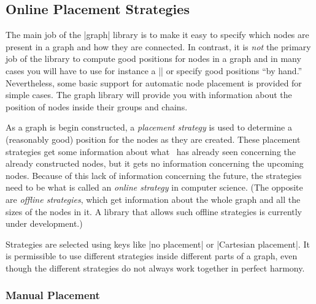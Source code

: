 \subsection{Online Placement Strategies}
\label{section-library-graphs-placement}

The main job of the |graph| library is to make it easy to specify
which nodes are present in a graph and how they are connected. In
contrast, it is \emph{not} the primary job of the library to compute
good positions for nodes in a graph and in many cases you will have to
use for instance a |\matrix| or specify good positions ``by hand.''
Nevertheless, some basic support for automatic node placement is
provided for simple cases. The graph library will provide you with
information about the position of nodes inside their groups and
chains. 


As a graph is begin constructed, a \emph{placement strategy} is used
to determine a (reasonably good) position for the nodes as they are
created. These placement strategies get some information about what
\tikzname\ has already seen concerning the already constructed nodes,
but it gets no information concerning the upcoming nodes. Because of
this lack of information concerning the future, the strategies need to
be what is called an \emph{online strategy} in computer science. (The
opposite are \emph{offline strategies}, which get information about
the whole graph and all the sizes of the nodes in it. A library that
allows such offline strategies is currently under development.)

Strategies are selected using keys like |no placement| or
|Cartesian placement|. It is permissible to use different strategies inside
different parts of a graph, even though the different strategies do
not always work together in perfect harmony.


\subsubsection{Manual Placement}
\label{section-graphs-xy}

